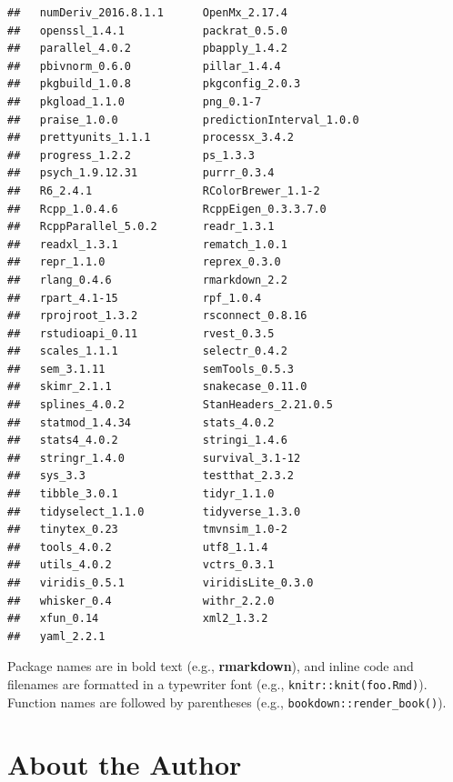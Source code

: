 \documentclass[
]{krantz}
\begin{document}
\begin{verbatim}
##   numDeriv_2016.8.1.1      OpenMx_2.17.4           
##   openssl_1.4.1            packrat_0.5.0           
##   parallel_4.0.2           pbapply_1.4.2           
##   pbivnorm_0.6.0           pillar_1.4.4            
##   pkgbuild_1.0.8           pkgconfig_2.0.3         
##   pkgload_1.1.0            png_0.1-7               
##   praise_1.0.0             predictionInterval_1.0.0
##   prettyunits_1.1.1        processx_3.4.2          
##   progress_1.2.2           ps_1.3.3                
##   psych_1.9.12.31          purrr_0.3.4             
##   R6_2.4.1                 RColorBrewer_1.1-2      
##   Rcpp_1.0.4.6             RcppEigen_0.3.3.7.0     
##   RcppParallel_5.0.2       readr_1.3.1             
##   readxl_1.3.1             rematch_1.0.1           
##   repr_1.1.0               reprex_0.3.0            
##   rlang_0.4.6              rmarkdown_2.2           
##   rpart_4.1-15             rpf_1.0.4               
##   rprojroot_1.3.2          rsconnect_0.8.16        
##   rstudioapi_0.11          rvest_0.3.5             
##   scales_1.1.1             selectr_0.4.2           
##   sem_3.1.11               semTools_0.5.3          
##   skimr_2.1.1              snakecase_0.11.0        
##   splines_4.0.2            StanHeaders_2.21.0.5    
##   statmod_1.4.34           stats_4.0.2             
##   stats4_4.0.2             stringi_1.4.6           
##   stringr_1.4.0            survival_3.1-12         
##   sys_3.3                  testthat_2.3.2          
##   tibble_3.0.1             tidyr_1.1.0             
##   tidyselect_1.1.0         tidyverse_1.3.0         
##   tinytex_0.23             tmvnsim_1.0-2           
##   tools_4.0.2              utf8_1.1.4              
##   utils_4.0.2              vctrs_0.3.1             
##   viridis_0.5.1            viridisLite_0.3.0       
##   whisker_0.4              withr_2.2.0             
##   xfun_0.14                xml2_1.3.2              
##   yaml_2.2.1
\end{verbatim}

Package names are in bold text (e.g., \textbf{rmarkdown}), and inline code and filenames are formatted in a typewriter font (e.g., \texttt{knitr::knit(\textquotesingle{}foo.Rmd\textquotesingle{})}). Function names are followed by parentheses (e.g., \texttt{bookdown::render\_book()}).

\hypertarget{about-the-author}{%
\chapter*{About the Author}\label{about-the-author}}
\end{document}
